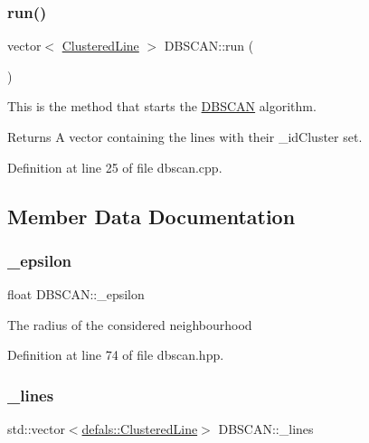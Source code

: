 \subsubsection{\texorpdfstring{run()}{run()}}
{\footnotesize\ttfamily vector$<$ \hyperlink{classdefals_1_1_clustered_line}{Clustered\+Line} $>$ D\+B\+S\+C\+A\+N\+::run (\begin{DoxyParamCaption}{ }\end{DoxyParamCaption})}

This is the method that starts the \hyperlink{class_d_b_s_c_a_n}{D\+B\+S\+C\+AN} algorithm.

\begin{DoxyReturn}{Returns}
A vector containing the lines with their \+\_\+id\+Cluster set. 
\end{DoxyReturn}


Definition at line 25 of file dbscan.\+cpp.



\subsection{Member Data Documentation}
\mbox{\label{class_d_b_s_c_a_n_a4e9de40c172ec17ad4b291d5ea71466a}} 
\subsubsection{\texorpdfstring{\+\_\+epsilon}{\_epsilon}}
{\footnotesize\ttfamily float D\+B\+S\+C\+A\+N\+::\+\_\+epsilon\hspace{0.3cm}{\ttfamily [private]}}

The radius of the considered neighbourhood 

Definition at line 74 of file dbscan.\+hpp.

\mbox{\label{class_d_b_s_c_a_n_af7e2429a85e2246405d78e968435c910}} 
\subsubsection{\texorpdfstring{\+\_\+lines}{\_lines}}
{\footnotesize\ttfamily std\+::vector$<$\hyperlink{classdefals_1_1_clustered_line}{defals\+::\+Clustered\+Line}$>$ D\+B\+S\+C\+A\+N\+::\+\_\+lines\hspace{0.3cm}{\ttfamily [private]}}


